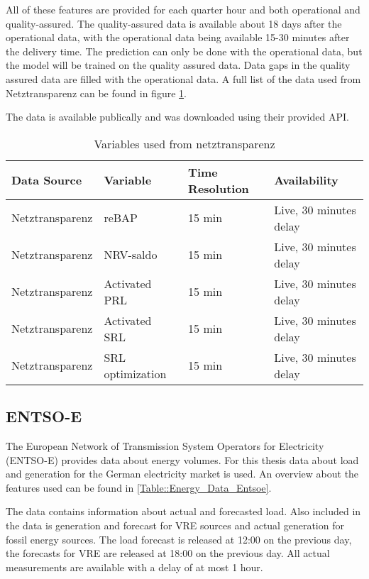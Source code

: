 \documentclass[class=scrbook, crop=false]{standalone}
\begin{document}
All of these features are provided for each quarter hour and both operational and quality-assured. The quality-assured data is available about 18 days after the operational data, with the operational data being available 15-30 minutes after the delivery time. 
The prediction can only be done with the operational data, but the model will be trained on the quality assured data. 
Data gaps in the quality assured data are filled with the operational data. A full list of the data used from Netztransparenz can be found in figure \ref{Table::Energy_Data_Netztransparenz}.

The data is available publically and was downloaded using their provided API.

\begin{table}[]
\centering
\begin{tabular}{l|l|l|l}
 Data Source & Variable &  Time Resolution & Availability  \\\hline
 Netztransparenz & reBAP & 15 min & Live, 30 minutes delay \\
 Netztransparenz & NRV-saldo & 15 min & Live, 30 minutes delay \\
 Netztransparenz & Activated PRL & 15 min &Live, 30 minutes delay \\
 Netztransparenz & Activated SRL & 15 min & Live, 30 minutes delay \\
 Netztransparenz & SRL optimization & 15 min & Live, 30 minutes delay \\

\end{tabular}
\caption{Variables used from netztransparenz}
\label{Table::Energy_Data_Netztransparenz}
\end{table}

\subsection{ENTSO-E}
The European Network of Transmission System Operators for Electricity (ENTSO-E) provides data about energy volumes.
For this thesis data about load and generation for the German electricity market is used. 
An overview about the features used can be found in \ref{Table::Energy_Data_Entsoe}.

The data contains information about actual and forecasted load. Also included in the data is generation and forecast for VRE sources and actual generation for fossil energy sources. 
The load forecast is released at 12:00 on the previous day, the forecasts for VRE are released at 18:00 on the previous day. All actual measurements are available with a delay of at most 1 hour.
\end{document}
